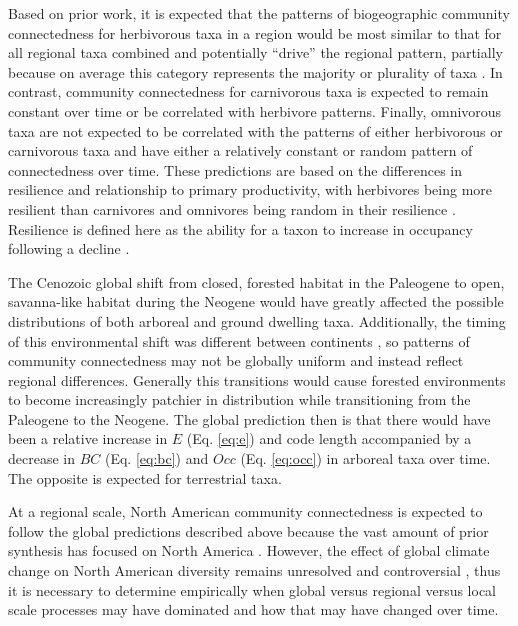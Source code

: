 \documentclass[12pt,letterpaper]{article}
\begin{document}
Based on prior work, it is expected that the patterns of biogeographic community connectedness for herbivorous taxa in a region would be most similar to that for all regional taxa combined and potentially ``drive'' the regional pattern, partially because on average this category represents the majority or plurality of taxa \citep{Jernvall2002}. In contrast, community connectedness for carnivorous taxa is expected to remain constant over time or be correlated with herbivore patterns. Finally, omnivorous taxa are not expected to be correlated with the patterns of either herbivorous or carnivorous taxa and have either a relatively constant or random pattern of connectedness over time.  These predictions are based on the differences in resilience and relationship to primary productivity, with herbivores being more resilient than carnivores and omnivores being random in their resilience \citep{Jernvall2004}. Resilience is defined here as the ability for a taxon to increase in occupancy following a decline \citep{Jernvall2004}.

The Cenozoic global shift from closed, forested habitat in the Paleogene to open, savanna-like habitat during the Neogene would have greatly affected the possible distributions of both arboreal and ground dwelling taxa. Additionally, the timing of this environmental shift was different between continents \citep{Stromberg2005,Stromberg2013}, so patterns of community connectedness may not be globally uniform and instead reflect regional differences. Generally this transitions would cause forested environments to become increasingly patchier in distribution while transitioning from the Paleogene to the Neogene. The global prediction then is that there would have been a relative increase in \(E\) (Eq. \ref{eq:e}) and code length accompanied by a decrease in \(BC\) (Eq. \ref{eq:bc}) and \(Occ\) (Eq. \ref{eq:occ}) in arboreal taxa over time. The opposite is expected for terrestrial taxa. 

At a regional scale, North American community connectedness is expected to follow the global predictions described above because the vast amount of prior synthesis has focused on North America \citep{Alroy2000g,Alroy1996a,Alroy1998,Barnosky2001a,Simpson1944,Simpson1953,Badgley2013,Blois2009,Figueirido2012,Gunnell1995,Hadly2001}. However, the effect of global climate change on North American diversity remains unresolved and controversial \citep{Alroy2000g,Blois2009,Figueirido2012,Barnosky2001a}, thus it is necessary to determine empirically when global versus regional versus local scale processes may have dominated and how that may have changed over time.
\end{document}
